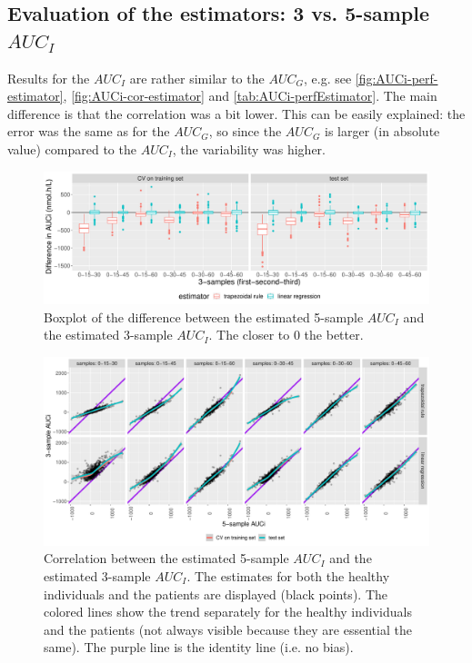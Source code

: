 \documentclass[12pt]{article}
\begin{document}
\subsection{Evaluation of the estimators: 3 vs. 5-sample \(AUC_I\)}
\label{sec:org5d07299}

Results for the \(AUC_I\) are rather similar to the \(AUC_G\),
e.g. see \autoref{fig:AUCi-perf-estimator},
\autoref{fig:AUCi-cor-estimator} and \autoref{tab:AUCi-perfEstimator}. The
main difference is that the correlation was a bit lower. This can be
easily explained: the error was the same as for the \(AUC_G\), so
since the \(AUC_G\) is larger (in absolute value) compared to the
\(AUC_I\), the variability was higher. 

\begin{figure}[!h]
\centering
\includegraphics[width=1\textwidth]{./figures/AUCi-perf-boxplot.pdf}
\caption{\label{fig:AUCi-perf-estimator}Boxplot of the difference between the estimated 5-sample \(AUC_I\) and the estimated 3-sample \(AUC_I\). The closer to 0 the better.}
\end{figure}

\begin{figure}[!h]
\centering
\includegraphics[width=1\textwidth]{./figures/AUCi-perf-cor.pdf}
\caption{\label{fig:AUCi-cor-estimator}Correlation between the estimated 5-sample \(AUC_I\) and the estimated 3-sample \(AUC_I\). The estimates for both the healthy individuals and the patients are displayed (black points). The colored lines show the trend separately for the healthy individuals and the patients (not always visible because they are essential the same). The purple line is the identity line (i.e. no bias).}
\end{figure}
\end{document}
